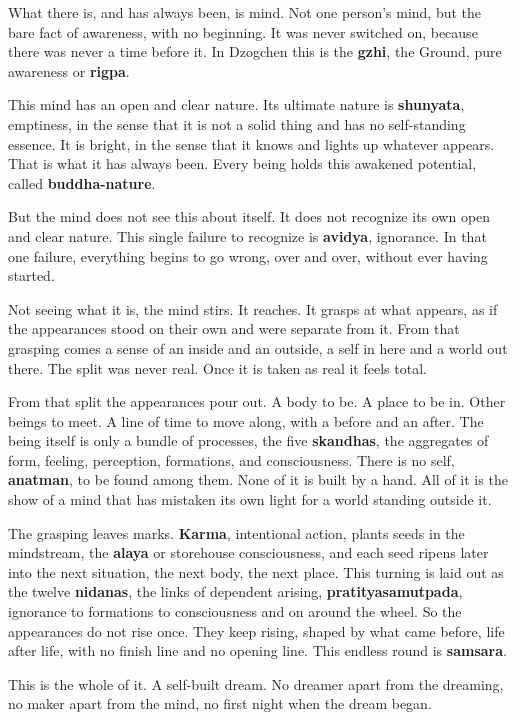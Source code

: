 What there is, and has always been, is mind. Not one person's mind, but the bare
fact of awareness, with no beginning. It was never switched on, because there was
never a time before it. In Dzogchen this is the \textbf{gzhi}, the Ground, pure
awareness or \textbf{rigpa}.

This mind has an open and clear nature. Its ultimate nature is \textbf{shunyata},
emptiness, in the sense that it is not a solid thing and has no self-standing
essence. It is bright, in the sense that it knows and lights up whatever appears.
That is what it has always been. Every being holds this awakened potential, called
\textbf{buddha-nature}.

But the mind does not see this about itself. It does not recognize its own open and
clear nature. This single failure to recognize is \textbf{avidya}, ignorance. In
that one failure, everything begins to go wrong, over and over, without ever having
started.

Not seeing what it is, the mind stirs. It reaches. It grasps at what appears, as if
the appearances stood on their own and were separate from it. From that grasping
comes a sense of an inside and an outside, a self in here and a world out there. The
split was never real. Once it is taken as real it feels total.

From that split the appearances pour out. A body to be. A place to be in. Other
beings to meet. A line of time to move along, with a before and an after. The being
itself is only a bundle of processes, the five \textbf{skandhas}, the aggregates of
form, feeling, perception, formations, and consciousness. There is no self,
\textbf{anatman}, to be found among them. None of it is built by a hand. All of it
is the show of a mind that has mistaken its own light for a world standing outside
it.

The grasping leaves marks. \textbf{Karma}, intentional action, plants seeds in the
mindstream, the \textbf{alaya} or storehouse consciousness, and each seed ripens
later into the next situation, the next body, the next place. This turning is laid
out as the twelve \textbf{nidanas}, the links of dependent arising,
\textbf{pratityasamutpada}, ignorance to formations to consciousness and on around
the wheel. So the appearances do not rise once. They keep rising, shaped by what
came before, life after life, with no finish line and no opening line. This endless
round is \textbf{samsara}.

This is the whole of it. A self-built dream. No dreamer apart from the dreaming, no
maker apart from the mind, no first night when the dream began.


